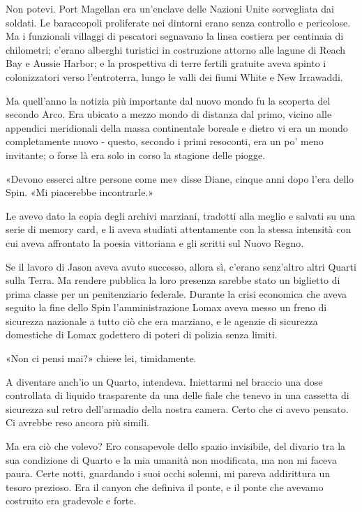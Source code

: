 Non potevi. Port Magellan era un'enclave delle Nazioni Unite sorvegliata
dai soldati. Le baraccopoli proliferate nei dintorni erano senza
controllo e pericolose. Ma i funzionali villaggi di pescatori segnavano
la linea costiera per centinaia di chilometri; c'erano alberghi
turistici in costruzione attorno alle lagune di Reach Bay e Aussie
Harbor; e la prospettiva di terre fertili gratuite aveva spinto i
colonizzatori verso l'entroterra, lungo le valli dei fiumi White e New
Irrawaddi.

Ma quell'anno la notizia più importante dal nuovo mondo fu la scoperta
del secondo Arco. Era ubicato a mezzo mondo di distanza dal primo,
vicino alle appendici meridionali della massa continentale boreale e
dietro vi era un mondo completamente nuovo - questo, secondo i primi
resoconti, era un po' meno invitante; o forse là era solo in corso la
stagione delle piogge.

\separatorefiori

«Devono esserci altre persone come me» disse Diane, cinque anni dopo
l'era dello Spin. «Mi piacerebbe incontrarle.»

Le avevo dato la copia degli archivi marziani, tradotti alla meglio e
salvati su una serie di memory card, e li aveva studiati attentamente
con la stessa intensità con cui aveva affrontato la poesia vittoriana e
gli scritti sul Nuovo Regno.

Se il lavoro di Jason aveva avuto successo, allora sì, c'erano
senz'altro altri Quarti sulla Terra. Ma rendere pubblica la loro
presenza sarebbe stato un biglietto di prima classe per un penitenziario
federale. Durante la crisi economica che aveva seguito la fine dello
Spin l'amministrazione Lomax aveva messo un freno di sicurezza nazionale
a tutto ciò che era marziano, e le agenzie di sicurezza domestiche di
Lomax godettero di poteri di polizia senza limiti.

«Non ci pensi mai?» chiese lei, timidamente.

A diventare anch'io un Quarto, intendeva. Iniettarmi nel braccio una
dose controllata di liquido trasparente da una delle fiale che tenevo in
una cassetta di sicurezza sul retro dell'armadio della nostra camera.
Certo che ci avevo pensato. Ci avrebbe reso ancora più simili.

Ma era ciò che volevo? Ero consapevole dello spazio invisibile, del
divario tra la sua condizione di Quarto e la mia umanità non modificata,
ma non mi faceva paura. Certe notti, guardando i suoi occhi solenni, mi
pareva addirittura un tesoro prezioso. Era il canyon che definiva il
ponte, e il ponte che avevamo costruito era gradevole e forte.

